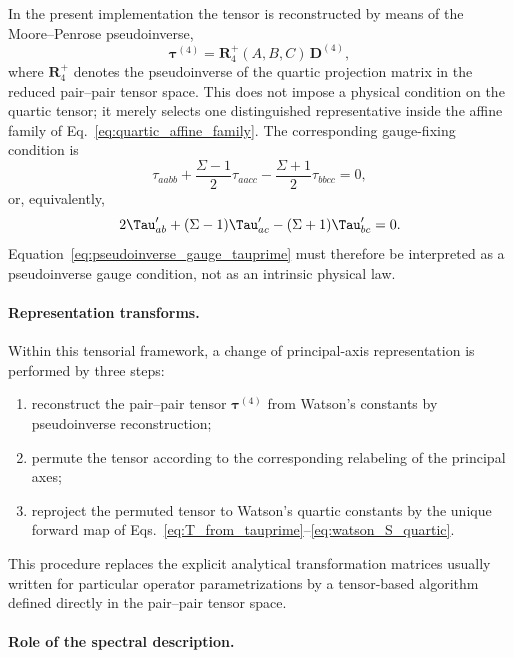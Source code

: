 In the present implementation the tensor is reconstructed by means of the
Moore--Penrose pseudoinverse,
\begin{equation}
\boldsymbol\tau^{(4)}=
\mathbf R_4^{+}(A,B,C)\,\mathbf D^{(4)},
\label{eq:quartic_pseudoinverse}
\end{equation}
where $\mathbf R_4^{+}$ denotes the pseudoinverse of the quartic projection
matrix in the reduced pair--pair tensor space.  This does not impose a physical
condition on the quartic tensor; it merely selects one distinguished
representative inside the affine family of Eq.~\eqref{eq:quartic_affine_family}.
The corresponding gauge-fixing condition is
\begin{equation}
\tau_{aabb}+\frac{\Sigma-1}{2}\tau_{aacc}
-\frac{\Sigma+1}{2}\tau_{bbcc}=0,
\label{eq:pseudoinverse_gauge_tau}
\end{equation}
or, equivalently,
\begin{equation}
2\Tau'_{ab}+(\Sigma-1)\Tau'_{ac}-(\Sigma+1)\Tau'_{bc}=0.
\label{eq:pseudoinverse_gauge_tauprime}
\end{equation}
Equation~\eqref{eq:pseudoinverse_gauge_tauprime} must therefore be interpreted
as a pseudoinverse gauge condition, not as an intrinsic physical law.

\paragraph{Representation transforms.}

Within this tensorial framework, a change of principal-axis representation is
performed by three steps:
\begin{enumerate}
\item reconstruct the pair--pair tensor $\boldsymbol\tau^{(4)}$ from Watson's
constants by pseudoinverse reconstruction;
\item permute the tensor according to the corresponding relabeling of the
principal axes;
\item reproject the permuted tensor to Watson's quartic constants by the unique
forward map of Eqs.~\eqref{eq:T_from_tauprime}--\eqref{eq:watson_S_quartic}.
\end{enumerate}
This procedure replaces the explicit analytical transformation matrices usually
written for particular operator parametrizations by a tensor-based algorithm
defined directly in the pair--pair tensor space.

\paragraph{Role of the spectral description.}

